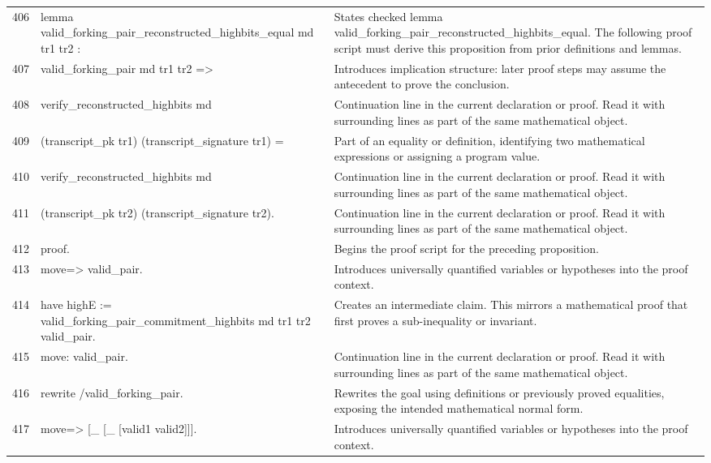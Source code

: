 \documentclass[10pt]{article}
\begin{document}
\begin{longtable}{r L{0.53\textwidth} L{0.37\textwidth}}
406 & {\ttfamily\scriptsize lemma valid\_forking\_pair\_reconstructed\_highbits\_equal md tr1 tr2 :} & States checked lemma valid\_forking\_pair\_reconstructed\_highbits\_equal.  The following proof script must derive this proposition from prior definitions and lemmas. \\
407 & {\ttfamily\scriptsize   valid\_forking\_pair md tr1 tr2 =>} & Introduces implication structure: later proof steps may assume the antecedent to prove the conclusion. \\
408 & {\ttfamily\scriptsize   verify\_reconstructed\_highbits md} & Continuation line in the current declaration or proof.  Read it with surrounding lines as part of the same mathematical object. \\
409 & {\ttfamily\scriptsize     (transcript\_pk tr1) (transcript\_signature tr1) =} & Part of an equality or definition, identifying two mathematical expressions or assigning a program value. \\
410 & {\ttfamily\scriptsize   verify\_reconstructed\_highbits md} & Continuation line in the current declaration or proof.  Read it with surrounding lines as part of the same mathematical object. \\
411 & {\ttfamily\scriptsize     (transcript\_pk tr2) (transcript\_signature tr2).} & Continuation line in the current declaration or proof.  Read it with surrounding lines as part of the same mathematical object. \\
412 & {\ttfamily\scriptsize proof.} & Begins the proof script for the preceding proposition. \\
413 & {\ttfamily\scriptsize move=> valid\_pair.} & Introduces universally quantified variables or hypotheses into the proof context. \\
414 & {\ttfamily\scriptsize have highE := valid\_forking\_pair\_commitment\_highbits md tr1 tr2 valid\_pair.} & Creates an intermediate claim.  This mirrors a mathematical proof that first proves a sub-inequality or invariant. \\
415 & {\ttfamily\scriptsize move: valid\_pair.} & Continuation line in the current declaration or proof.  Read it with surrounding lines as part of the same mathematical object. \\
416 & {\ttfamily\scriptsize rewrite /valid\_forking\_pair.} & Rewrites the goal using definitions or previously proved equalities, exposing the intended mathematical normal form. \\
417 & {\ttfamily\scriptsize move=> [\_ [\_ [valid1 valid2]]].} & Introduces universally quantified variables or hypotheses into the proof context. \\

\end{longtable}
\end{document}
